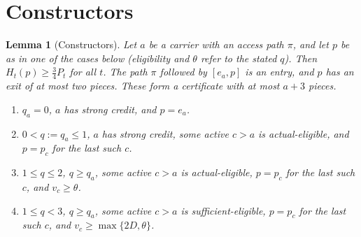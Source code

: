 \documentclass[11pt,a4paper]{article}
\numberwithin{equation}{section}
\newtheorem{lemma}[theorem]{Lemma}
\theoremstyle{definition}
\begin{document}
\section{Constructors}\label{sec:constructors}

\begin{lemma}[Constructors]\label{lem:constructors}
Let $a$ be a carrier with an access path $\pi$, and let $p$ be as in one of the
cases below (eligibility and $\theta$ refer to the stated $q$). Then
$H_t(p)\ge\frac34P_t$ for all $t$. The path $\pi$ followed by $[e_a,p]$ is an
entry, and $p$ has an exit of at most two pieces. These form a certificate with
at most $a+3$ pieces.
\begin{enumerate}
\item[(V)] $q_a=0$, $a$ has strong credit, and $p=e_a$.
\item[(L)] $0<q:=q_a\le1$, $a$ has strong credit, some active $c>a$ is
actual-eligible, and $p=p_c$ for the last such $c$.
\item[(A)] $1\le q\le2$, $q\ge q_a$, some active $c>a$ is actual-eligible,
$p=p_c$ for the last such $c$, and $v_c\ge\theta$.
\item[(S)] $1\le q<3$, $q\ge q_a$, some active $c>a$ is sufficient-eligible,
$p=p_c$ for the last such $c$, and $v_c\ge\max\{2D,\theta\}$.
\end{enumerate}
\end{lemma}
\end{document}
